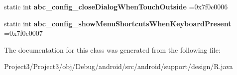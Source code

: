 \begin{DoxyCompactItemize}
\item 
\mbox{\label{classandroid_1_1support_1_1design_1_1R_1_1bool_a0318b434f92d131f08fb16f029fe5400}} 
static int {\bfseries abc\+\_\+config\+\_\+close\+Dialog\+When\+Touch\+Outside} =0x7f0c0006
\item 
\mbox{\label{classandroid_1_1support_1_1design_1_1R_1_1bool_af95d26aa03ef6092b38e8b5ea531c613}} 
static int {\bfseries abc\+\_\+config\+\_\+show\+Menu\+Shortcuts\+When\+Keyboard\+Present} =0x7f0c0007
\end{DoxyCompactItemize}


The documentation for this class was generated from the following file\+:\begin{DoxyCompactItemize}
\item 
Project3/\+Project3/obj/\+Debug/android/src/android/support/design/R.\+java\end{DoxyCompactItemize}
